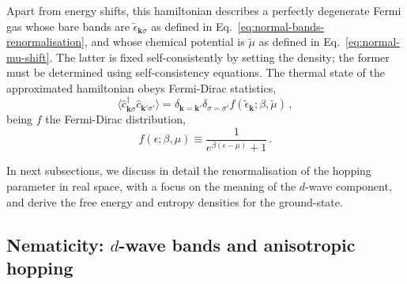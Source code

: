 Apart from energy shifts, this hamiltonian describes a perfectly degenerate Fermi gas whose bare bands are $\tilde{\epsilon}_{\mathbf{k}\sigma}$ as defined in Eq.~\eqref{eq:normal-bands-renormalisation}, and whose chemical potential is $\tilde{\mu}$ as defined in Eq.~\eqref{eq:normal-mu-shift}. The latter is fixed self-consistently by setting the density; the former must be determined using self-consistency equations. The thermal state of the approximated hamiltonian obeys Fermi-Dirac statistics,
\begin{equation}\label{eq:normal-<cc>-FD}
	\langle \hat c_{\mathbf{k}\sigma}^\dagger \hat c_{\mathbf{k}'\sigma'} \rangle = \delta_{\mathbf{k}=\mathbf{k}'} \delta_{\sigma=\sigma'} f(\tilde{\epsilon}_\mathbf{k};\beta,\tilde{\mu}) \, ,
\end{equation}
being $f$ the Fermi-Dirac distribution,
\[
	f(\epsilon;\beta,\mu) \equiv \frac{1}{e^{\beta(\epsilon-\mu)}+1} \, .
\]

In next subsections, we discuss in detail the renormalisation of the hopping parameter in real space, with a focus on the meaning of the $d$-wave component, and derive the free energy and entropy densities for the ground-state.

\subsection{Nematicity: $d$-wave bands and anisotropic hopping}\label{subsec:normal-d-wave-hopping}

